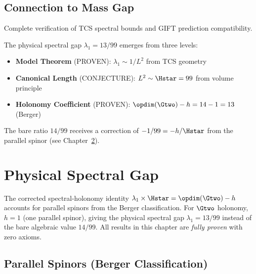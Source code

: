 \section{Connection to Mass Gap}

\begin{theorem}\label{thm:tcs_certificate}
    \leanok
    Complete verification of TCS spectral bounds and GIFT prediction compatibility.
\end{theorem}

\begin{remark}
    The physical spectral gap $\lambda_1 = 13/99$ emerges from three levels:
    \begin{itemize}
        \item \textbf{Model Theorem} (PROVEN): $\lambda_1 \sim 1/L^2$ from TCS geometry
        \item \textbf{Canonical Length} (CONJECTURE): $L^2 \sim \Hstar = 99$ from volume principle
        \item \textbf{Holonomy Coefficient} (PROVEN): $\opdim(\Gtwo) - h = 14 - 1 = 13$ (Berger)
    \end{itemize}
    The bare ratio $14/99$ receives a correction of $-1/99 = -h/\Hstar$ from the
    parallel spinor (see Chapter~\ref{chap:physical_spectral}).
\end{remark}

\chapter{Physical Spectral Gap}\label{chap:physical_spectral}

The corrected spectral-holonomy identity $\lambda_1 \times \Hstar = \opdim(\Gtwo) - h$
accounts for parallel spinors from the Berger classification. For $\Gtwo$ holonomy,
$h = 1$ (one parallel spinor), giving the physical spectral gap
$\lambda_1 = 13/99$ instead of the bare algebraic value $14/99$.
All results in this chapter are \emph{fully proven} with zero axioms.

\section{Parallel Spinors (Berger Classification)}

